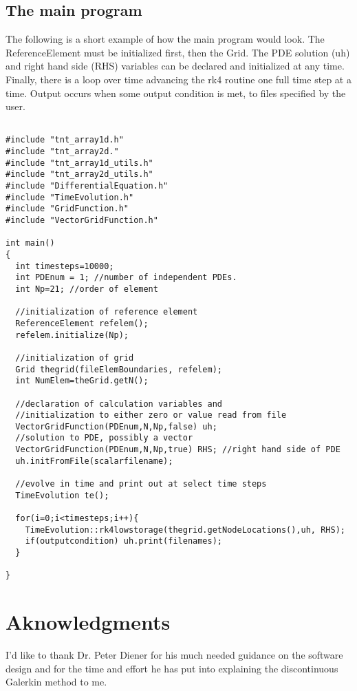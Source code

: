\documentclass{article}
\begin{document}
\subsection{The main program}

The following is a short example of how the main program would
look. The ReferenceElement must be initialized first, then the
Grid. The PDE solution (uh) and right hand side (RHS) variables can be
declared and initialized at any time. Finally, there is a loop over
time advancing the rk4 routine one full time step at a time. Output
occurs when some output condition is met, to files specified by the
user.

\begin{verbatim}

#include "tnt_array1d.h"
#include "tnt_array2d."
#include "tnt_array1d_utils.h"
#include "tnt_array2d_utils.h"
#include "DifferentialEquation.h"
#include "TimeEvolution.h"
#include "GridFunction.h"
#include "VectorGridFunction.h"

int main()
{
  int timesteps=10000;
  int PDEnum = 1; //number of independent PDEs. 
  int Np=21; //order of element

  //initialization of reference element
  ReferenceElement refelem();
  refelem.initialize(Np);
  
  //initialization of grid
  Grid thegrid(fileElemBoundaries, refelem);
  int NumElem=theGrid.getN();

  //declaration of calculation variables and 
  //initialization to either zero or value read from file
  VectorGridFunction(PDEnum,N,Np,false) uh; 
  //solution to PDE, possibly a vector 
  VectorGridFunction(PDEnum,N,Np,true) RHS; //right hand side of PDE
  uh.initFromFile(scalarfilename);

  //evolve in time and print out at select time steps
  TimeEvolution te();

  for(i=0;i<timesteps;i++){
    TimeEvolution::rk4lowstorage(thegrid.getNodeLocations(),uh, RHS);
    if(outputcondition) uh.print(filenames);
  }

}
\end{verbatim}

\section{Aknowledgments}

I'd like to thank Dr. Peter Diener for his much needed guidance on the
software design and for the time and effort he has put into explaining
the discontinuous Galerkin method to me.
\end{document}
